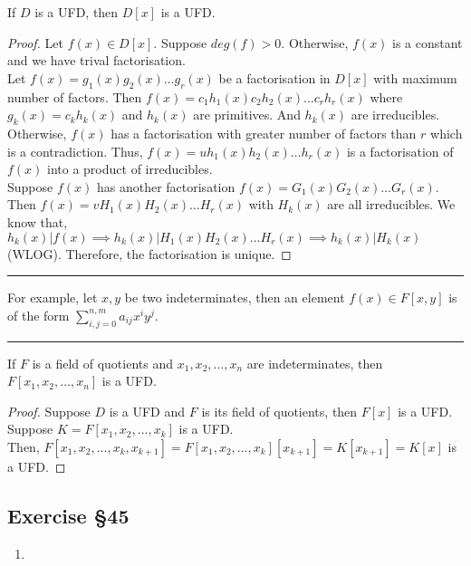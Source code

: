 \begin{theorem}
	If $D$ is a UFD, then $D[x]$ is a UFD.
\end{theorem}
\begin{proof}
	Let $f(x) \in D[x]$.
	Suppose $deg(f) > 0$.
	Otherwise, $f(x)$ is a constant and we have trival factorisation.\\
	
	Let $f(x) = g_1(x)g_2(x)\dots g_r(x)$ be a factorisation in $D[x]$ with maximum number of factors.	
	Then $f(x) = c_1h_1(x)c_2h_2(x)\dots c_rh_r(x)$ where $g_k(x) = c_kh_k(x)$ and $h_k(x)$ are primitives.
	And $h_k(x)$ are irreducibles.
	Otherwise, $f(x)$ has a factorisation with greater number of factors than $r$ which is a contradiction.
	Thus, $f(x) = uh_1(x)h_2(x)\dots h_r(x)$ is a factorisation of $f(x)$ into a product of irreducibles.\\

	Suppose $f(x)$ has another factorisation $f(x) = G_1(x)G_2(x)\dots G_r(x)$.
	Then $f(x) = vH_1(x)H_2(x)\dots H_r(x)$ with $H_k(x)$ are all irreducibles.
	We know that, $h_k(x) | f(x) \implies h_k(x) | H_1(x)H_2(x)\dots H_r(x) \implies h_k(x) | H_k(x)$ (WLOG).
	Therefore, the factorisation is unique.
\end{proof}
\hrule\vspace{1em}
For example, let $x,y$ be two indeterminates, then an element $f(x) \in F[x,y]$ is of the form $\displaystyle\sum_{i,j = 0}^{n,m} a_{ij}x^i y^j$.
\hrule\vspace{1em}
\begin{corollary}
	If $F$ is a field of quotients and $x_1,x_2,\dots,x_n$ are indeterminates, then $F[x_1,x_2,\dots,x_n]$ is a UFD.
\end{corollary}
\begin{proof}
	Suppose $D$ is a UFD and $F$ is its field of quotients, then $F[x]$ is a UFD.\\

	Suppose $K = F[x_1,x_2,\dots,x_k]$ is a UFD.\\

	Then, $F[x_1,x_2,\dots,x_k,x_{k+1}] = F[x_1,x_2,\dots,x_k][x_{k+1}] = K[x_{k+1}] = K[x]$ is a UFD.
\end{proof}

\subsection{Exercise \S45}
\begin{enumerate}
	\item
\end{enumerate}

